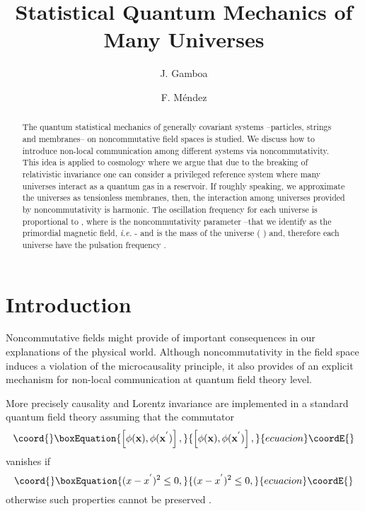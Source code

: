 \documentclass[a4paper,aps,twocolumn,amsfonts]{revtex4}
\begin{document}
   \title{Statistical Quantum Mechanics of Many Universes}
   \author{J. Gamboa
   }
   \author{F. M\'endez}
   \begin{abstract}
   The quantum statistical mechanics of generally covariant systems --particles, strings and membranes-- on noncommutative field spaces is studied.  We discuss how to introduce non-local communication among different systems via noncommutativity. This idea is applied to cosmology where we argue that due to the breaking of relativistic invariance  one can consider a privileged  reference system where many universes interact as a quantum gas in a reservoir. If roughly  speaking, we approximate the universes as tensionless membranes, then,  the interaction among universes 
   provided by noncommutativity is harmonic. The oscillation frequency for each universe is proportional to \coordHE{}, where \coordHE{} is the  noncommutativity parameter  --that we identify as the primordial magnetic field,  {\it i.e.}  \coordHE{}- and \coordHE{} is the mass of the 
   universe ( \coordHE{}) and, therefore each universe have the  pulsation frequency  \coordHE{}.  
   \end{abstract}
   \maketitle

   \section{Introduction}
   Noncommutative fields might provide of important consequences in our explanations of the physical world. Although noncommutativity in the field space induces a violation of the microcausality principle, it also provides of an explicit mechanism for non-local communication at quantum field theory level.

   More precisely  causality and Lorentz invariance are implemented in a standard quantum field theory assuming that the commutator 
   \begin{equation}\coord{}\boxEquation{
   \left[ \phi ({\bf x}), \phi ({\bf x}^{'})\right], \label{1}
   }{
   \left[ \phi ({\bf x}), \phi ({\bf x}^{'})\right], }{ecuacion}\coordE{}\end{equation}
   vanishes  if 
   \begin{equation}\coord{}\boxEquation{
   (x - x^{'})^2 \leq 0,  \label{2}
   }{
   (x - x^{'})^2 \leq 0,  }{ecuacion}\coordE{}\end{equation}
otherwise such properties cannot be preserved \cite{kos} . 
\end{document}

